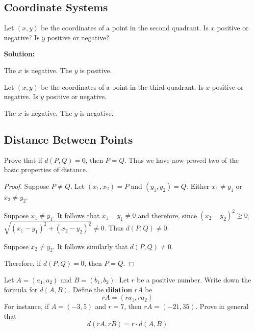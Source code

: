 \subsection{Coordinate Systems}

\begin{tcolorbox}[title=Problem 3, breakable]
    Let $(x, y)$ be the coordinates of a point
    in the second quadrant.
    Is $x$ positive or negative?
    Is $y$ positive or negative?
\end{tcolorbox}

\textbf{Solution:}

The $x$ is negative.
The $y$ is positive.

\begin{tcolorbox}[title=Problem 4, breakable]
    Let $(x, y)$ be the coordinates of a point in the 
    third quadrant. Is $x$ positive or negative.
    Is $y$ positive or negative.
\end{tcolorbox}

The $x$ is negative.
The $y$ is negative.

\subsection{Distance Between Points}

\begin{tcolorbox}[title=Problem 11, breakable]
    Prove that if $d(P, Q) = 0$, then $P = Q$. Thus we have now 
    proved two of the basic properties of distance.
\end{tcolorbox}

\begin{proof}
    Suppose $P \ne Q$. Let $(x_1, x_2) = P$ and $(y_1, y_2) = Q$.
    Either $x_1 \ne y_1$ or $x_2 \ne y_2$.

    Suppose $x_1 \ne y_1$. It follows that $x_1 - y_1 \ne 0$
    and therefore, since $(x_2 - y_2)^2 \ge 0$, $\sqrt{(x_1 - y_1)^2 + (x_2 - y_2)^2} \ne 0$.
    Thus $d(P, Q) \ne 0$.

    Suppose $x_2 \ne y_2$. It follows similarly that $d(P, Q) \ne 0$.

    Therefore, if $d(P, Q) = 0$, then $P = Q$.
\end{proof}

\begin{tcolorbox}[title=Problem 12, breakable]
    Let $A = (a_1, a_2)$ and $B = (b_1, b_2)$.
    Let $r$ be a positive number.
    Write down the formula for $d(A, B)$.
    Define the \textbf{dilation} $r A$ be 
    \[r A = (r a_1, r a_2)\]
    For instance, if $A = (-3, 5)$ and $r = 7$,
    then $r A = (-21, 35)$. Prove in general that 
    \[d(r A, r B) = r \cdot d(A, B)\]
\end{tcolorbox}

